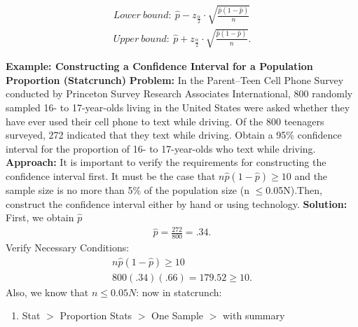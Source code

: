 \documentclass{report}
\begin{document}
      \begin{align*}
          Lower\ bound:\ \hat{p} - z_{\frac{\alpha}{2}} \cdot \sqrt{\frac{\hat{p}(1 - \hat{p})}{n}}  \\
          Upper\ bound:\ \hat{p} + z_{\frac{\alpha}{2}} \cdot \sqrt{\frac{\hat{p}(1 - \hat{p})}{n}}
      .\end{align*}
      \bigbreak \noindent 

      \pagebreak \bigbreak \noindent 
      \bigbreak \noindent 
      \begin{mdframed}
        \textbf{Example: Constructing a Confidence Interval for a Population Proportion (Statcrunch)}
        \bigbreak \noindent 
        \textbf{Problem:}
        In the Parent–Teen Cell Phone Survey conducted by Princeton Survey Research Associates International, 800 randomly sampled 16- to 17-year-olds living in the United States were asked whether they have ever used their cell phone to text while driving. Of the 800 teenagers surveyed, 272 indicated that they text while driving. Obtain a 95\% confidence interval for the proportion of 16- to 17-year-olds who text while driving.
        \bigbreak \noindent 
        \textbf{Approach:}
        It is important to verify the requirements for constructing the confidence interval first. It must be the case that $n\hat{p}(1 −\hat{p}) \geq 10$ and the sample size is no more than 5\% of the population size (n $ \leq $0.05N).Then, construct the confidence interval either by hand or using technology.
        \bigbreak \noindent 
        \textbf{Solution:}
        \bigbreak \noindent 
        First, we obtain $\hat{p} $
        \begin{align*}
            \hat{p} = \frac{272}{800} = .34
        .\end{align*}
        \bigbreak \noindent 
        Verify Necessary Conditions:
        \begin{align*}
           n\hat{p}(1-\hat{p})  \geq 10 \\
            800(.34)(.66) = 179.52 \geq 10
        .\end{align*}
        \bigbreak \noindent 
        Also, we know that $n \leq0.05N $:
        \bigbreak \noindent 
        now in statcrunch:
        \begin{enumerate}
            \item Stat $>$ Proportion Stats $> $ One Sample $> $ with summary

\end{enumerate}
\end{mdframed}
\end{document}
